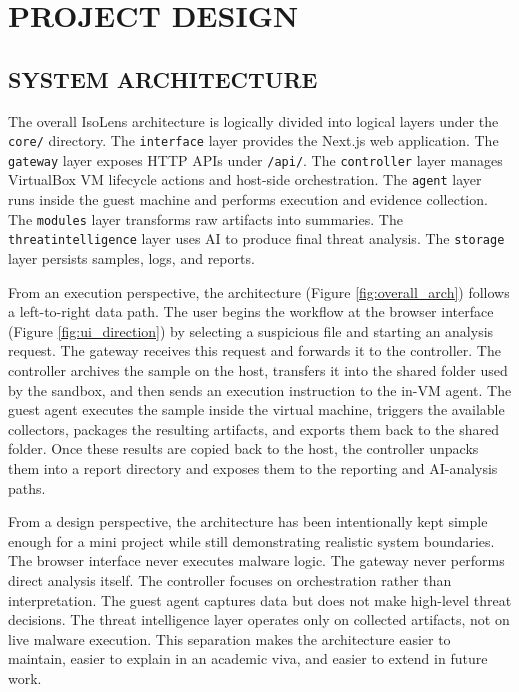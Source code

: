 \documentclass[a4paper,12pt,oneside]{report}
\begin{document}
\chapter{PROJECT DESIGN}
\section{SYSTEM ARCHITECTURE}
The overall IsoLens architecture is logically divided into logical layers under the \texttt{core/} directory. The \texttt{interface} layer provides the Next.js web application. The \texttt{gateway} layer exposes HTTP APIs under \texttt{/api/}. The \texttt{controller} layer manages VirtualBox VM lifecycle actions and host-side orchestration. The \texttt{agent} layer runs inside the guest machine and performs execution and evidence collection. The \texttt{modules} layer transforms raw artifacts into summaries. The \texttt{threatintelligence} layer uses AI to produce final threat analysis. The \texttt{storage} layer persists samples, logs, and reports.

\par

\par

From an execution perspective, the architecture (Figure \ref{fig:overall_arch}) follows a left-to-right data path. The user begins the workflow at the browser interface (Figure \ref{fig:ui_direction}) by selecting a suspicious file and starting an analysis request. The gateway receives this request and forwards it to the controller. The controller archives the sample on the host, transfers it into the shared folder used by the sandbox, and then sends an execution instruction to the in-VM agent. The guest agent executes the sample inside the virtual machine, triggers the available collectors, packages the resulting artifacts, and exports them back to the shared folder. Once these results are copied back to the host, the controller unpacks them into a report directory and exposes them to the reporting and AI-analysis paths.

\par

\par

From a design perspective, the architecture has been intentionally kept simple enough for a mini project while still demonstrating realistic system boundaries. The browser interface never executes malware logic. The gateway never performs direct analysis itself. The controller focuses on orchestration rather than interpretation. The guest agent captures data but does not make high-level threat decisions. The threat intelligence layer operates only on collected artifacts, not on live malware execution. This separation makes the architecture easier to maintain, easier to explain in an academic viva, and easier to extend in future work.
\end{document}
